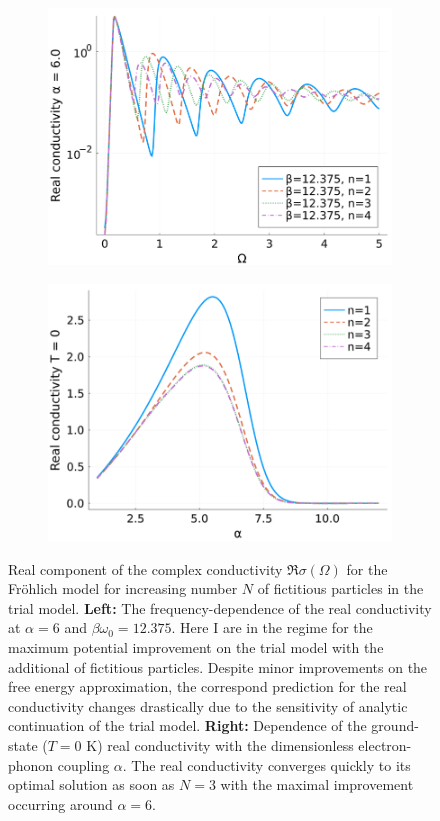\begin{figure}[!tbp]
    \centering
  \begin{subfigure}[b]{0.49\textwidth}
    \centering
    \includegraphics[width=\textwidth]{figures/cond_freq_bad.png}
  \end{subfigure}
  \hfill
  \begin{subfigure}[b]{0.49\textwidth}
    \centering
    \includegraphics[width=\textwidth]{figures/cond_alpha.png}
  \end{subfigure}
  \caption{Real component of the complex conductivity $\Re \sigma(\Omega)$ for the Fr\"ohlich model for increasing number $N$ of fictitious particles in the trial model. \textbf{Left:} The frequency-dependence of the real conductivity at $\alpha = 6$ and $\beta\omega_0=12.375$. Here I are in the regime for the maximum potential improvement on the trial model with the additional of fictitious particles. Despite minor improvements on the free energy approximation, the correspond prediction for the real conductivity changes drastically due to the sensitivity of analytic continuation of the trial model. \textbf{Right:} Dependence of the ground-state ($T = 0$ K) real conductivity with the dimensionless electron-phonon coupling $\alpha$. The real conductivity converges quickly to its optimal solution as soon as $N=3$ with the maximal improvement occurring around $\alpha = 6$.}
  \label{fig:multidyn}
\end{figure}

